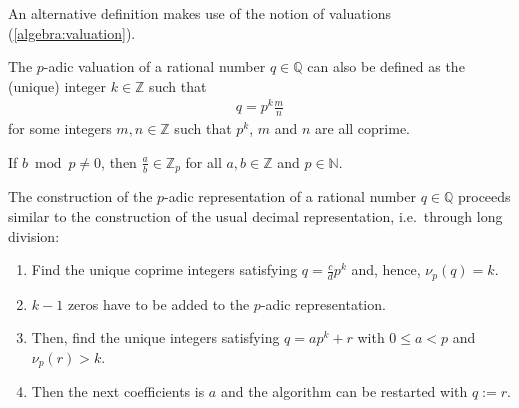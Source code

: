     An alternative definition makes use of the notion of valuations (\cref{algebra:valuation}).
    \begin{remark}
        The $p$-adic valuation of a rational number $q\in\mathbb{Q}$ can also be defined as the (unique) integer $k\in\mathbb{Z}$ such that
        \begin{gather}
            q = p^k\frac{m}{n}
        \end{gather}
        for some integers $m,n\in\mathbb{Z}$ such that $p^k$, $m$ and $n$ are all coprime.
    \end{remark}

    \begin{property}\label{number:rational_adic_integer}
        If $b\bmod p\neq0$, then $\tfrac{a}{b}\in\mathbb{Z}_p$ for all $a,b\in\mathbb{Z}$ and $p\in\mathbb{N}$.
        
        The construction of the $p$-adic representation of a rational number $q\in\mathbb{Q}$ proceeds similar to the construction of the usual decimal representation, i.e.~through long division:
        \begin{enumerate}
            \item Find the unique coprime integers satisfying $q=\frac{c}{d}p^k$ and, hence, $\nu_p(q)=k$.
            \item $k-1$ zeros have to be added to the $p$-adic representation.
            \item Then, find the unique integers satisfying $q=ap^k+r$ with $0\leq a<p$ and $\nu_p(r)>k$.
            \item Then the next coefficients is $a$ and the algorithm can be restarted with $q:=r$.
        \end{enumerate}
    \end{property}

